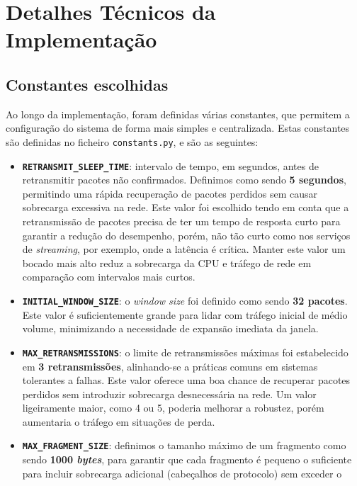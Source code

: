 \documentclass[a4paper,12pt]{scrreprt}
\begin{document}
\clearpage
{}

\section{Detalhes Técnicos da Implementação}

\subsection{Constantes escolhidas}

Ao longo da implementação, foram definidas várias constantes, que permitem a
configuração do sistema de forma mais simples e centralizada. Estas constantes
são definidas no ficheiro \texttt{constants.py}, e são as seguintes:
\begin{itemize}
    \item \textbf{\texttt{RETRANSMIT\_SLEEP\_TIME}}: intervalo de tempo, em segundos, antes de retransmitir pacotes não confirmados.
    Definimos como sendo \textbf{5 segundos}, permitindo uma rápida recuperação de pacotes perdidos sem causar sobrecarga excessiva na rede.
    Este valor foi escolhido tendo em conta que a retransmissão de pacotes precisa de ter um tempo de resposta curto para garantir a
    redução do desempenho, porém, não tão curto como nos serviços de \textit{streaming}, por exemplo, onde a latência é crítica.
    Manter este valor um bocado mais alto reduz a sobrecarga da CPU e tráfego de rede em comparação com intervalos mais curtos.
    \item \textbf{\texttt{INITIAL\_WINDOW\_SIZE}}: o \textit{window size} foi definido como sendo \textbf{32 pacotes}. 
    Este valor é suficientemente grande para lidar com tráfego inicial de médio volume, minimizando a necessidade de expansão imediata da janela. 
    \item \textbf{\texttt{MAX\_RETRANSMISSIONS}}: o limite de retransmissões máximas foi estabelecido em \textbf{3 retransmissões},
    alinhando-se a práticas comuns em sistemas tolerantes a falhas. Este valor oferece uma boa chance de recuperar pacotes perdidos sem
    introduzir sobrecarga desnecessária na rede. Um valor ligeiramente maior, como 4 ou 5, poderia melhorar a robustez, porém aumentaria
    o tráfego em situações de perda.
    \item \textbf{\texttt{MAX\_FRAGMENT\_SIZE}}: definimos o tamanho máximo de um fragmento como sendo \textbf{1000 \textit{bytes}},
    para garantir que cada fragmento é pequeno o suficiente para incluir sobrecarga adicional (cabeçalhos de protocolo) sem exceder o 

\end{itemize}
\end{document}
